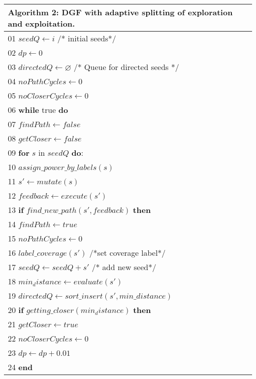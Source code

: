 \documentclass[bachelor]{njupthesis}
\begin{document}
\begin{table}[t]
\vspace{2ex}
\centering
\small 
\begin{tabular}{p{8.4cm}}
\hline
 
Algorithm 2: DGF with adaptive splitting of exploration and exploitation. \\   
\hline
01 $seedQ \leftarrow i$ \quad /* initial seeds*/ \\
02 $dp \leftarrow 0$ \\
03 $directedQ \leftarrow \varnothing$ \quad /* Queue for directed seeds */\\
04 $noPathCycles \leftarrow 0$ \\
05 $noCloserCycles \leftarrow 0$ \\
06 \textbf{while} true \textbf{do} \\
07 \quad $findPath \leftarrow false$ \\
08 \quad $getCloser \leftarrow false$ \\
09 \quad \textbf{for} $s$ in $seedQ$ \textbf{do}: \\
10 \quad\quad $assign\_power\_by\_labels(s)$ \\       
11 \quad\quad $s' \leftarrow mutate(s)$ \\
12 \quad\quad $feedback \leftarrow execute(s')$ \\
13 \quad\quad \textbf{if} $find\_new\_path(s', feedback)$ \textbf{then} \\
14 \quad\quad\quad $findPath \leftarrow true$ \\
15 \quad\quad\quad $noPathCycles \leftarrow 0$ \\
16 \quad\quad\quad $label\_coverage(s')$ \quad /*set coverage label*/ \\
17 \quad\quad\quad $seedQ \leftarrow seedQ + s'$ \quad /* add new seed*/ \\
18 \quad\quad\quad $min_distance \leftarrow evaluate(s')$ \\
19 \quad\quad\quad $directedQ \leftarrow sort\_insert(s', min\_distance)$ \\ 
20 \quad\quad\quad \textbf{if} $getting\_closer(min_distance)$ \textbf{then}\\
21 \quad\quad\quad\quad $getCloser \leftarrow true $ \\
22 \quad\quad\quad\quad $noCloserCycles \leftarrow 0$ \\
23 \quad\quad\quad\quad \underline{$dp \leftarrow dp + 0.01 $}\\          
24 \quad  \textbf{end} \\

\end{tabular}
\end{table}
\end{document}
